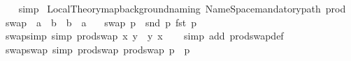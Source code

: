 \begin{isabellebody}
%
\isadelimproof
\ \ %
\endisadelimproof
%
\isatagproof
{}\isamarkupfalse%
\ simp%
\endisatagproof
{\isafoldproof}%
%
\isadelimproof
\isanewline
%
\endisadelimproof
\isanewline
{}\isamarkupfalse%
\isanewline
{}\isanewline
%
\isadelimML
\isanewline
%
\endisadelimML
%
\isatagML
{}\isamarkupfalse%
\ {\isacartoucheopen}Local{\isacharunderscore}{\kern0pt}Theory{\isachardot}{\kern0pt}map{\isacharunderscore}{\kern0pt}background{\isacharunderscore}{\kern0pt}naming\ {\isacharparenleft}{\kern0pt}Name{\isacharunderscore}{\kern0pt}Space{\isachardot}{\kern0pt}mandatory{\isacharunderscore}{\kern0pt}path\ {\isachardoublequote}{\kern0pt}prod{\isachardoublequote}{\kern0pt}{\isacharparenright}{\kern0pt}{\isacartoucheclose}%
\endisatagML
{\isafoldML}%
%
\isadelimML
\isanewline
%
\endisadelimML
\isanewline
{}\isamarkupfalse%
\ swap\ {\isacharcolon}{\kern0pt}{\isacharcolon}{\kern0pt}\ {\isachardoublequoteopen}{\isacharprime}{\kern0pt}a\ {\isasymtimes}\ {\isacharprime}{\kern0pt}b\ {\isasymRightarrow}\ {\isacharprime}{\kern0pt}b\ {\isasymtimes}\ {\isacharprime}{\kern0pt}a{\isachardoublequoteclose}\isanewline
\ \ \ {\isachardoublequoteopen}swap\ p\ {\isacharequal}{\kern0pt}\ {\isacharparenleft}{\kern0pt}snd\ p{\isacharcomma}{\kern0pt}\ fst\ p{\isacharparenright}{\kern0pt}{\isachardoublequoteclose}\isanewline
\isanewline
{}\isamarkupfalse%
\isanewline
\isanewline
{}\isamarkupfalse%
\ swap{\isacharunderscore}{\kern0pt}simp\ {\isacharbrackleft}{\kern0pt}simp{\isacharbrackright}{\kern0pt}{\isacharcolon}{\kern0pt}\ {\isachardoublequoteopen}prod{\isachardot}{\kern0pt}swap\ {\isacharparenleft}{\kern0pt}x{\isacharcomma}{\kern0pt}\ y{\isacharparenright}{\kern0pt}\ {\isacharequal}{\kern0pt}\ {\isacharparenleft}{\kern0pt}y{\isacharcomma}{\kern0pt}\ x{\isacharparenright}{\kern0pt}{\isachardoublequoteclose}\isanewline
%
\isadelimproof
\ \ %
\endisadelimproof
%
\isatagproof
{}\isamarkupfalse%
\ {\isacharparenleft}{\kern0pt}simp\ add{\isacharcolon}{\kern0pt}\ prod{\isachardot}{\kern0pt}swap{\isacharunderscore}{\kern0pt}def{\isacharparenright}{\kern0pt}%
\endisatagproof
{\isafoldproof}%
%
\isadelimproof
\isanewline
%
\endisadelimproof
\isanewline
{}\isamarkupfalse%
\ swap{\isacharunderscore}{\kern0pt}swap\ {\isacharbrackleft}{\kern0pt}simp{\isacharbrackright}{\kern0pt}{\isacharcolon}{\kern0pt}\ {\isachardoublequoteopen}prod{\isachardot}{\kern0pt}swap\ {\isacharparenleft}{\kern0pt}prod{\isachardot}{\kern0pt}swap\ p{\isacharparenright}{\kern0pt}\ {\isacharequal}{\kern0pt}\ p{\isachardoublequoteclose}\isanewline

\end{isabellebody}
